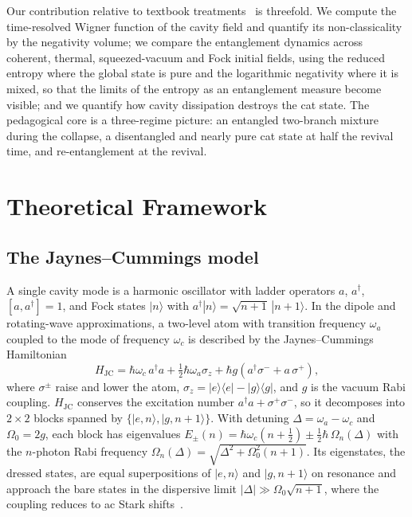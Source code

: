 \documentclass{iopjournal}
\begin{document}
Our contribution relative to textbook treatments~\cite{gerry2004, haroche2006} is threefold. We compute the time-resolved Wigner function of the cavity field and quantify its non-classicality by the negativity volume; we compare the entanglement dynamics across coherent, thermal, squeezed-vacuum and Fock initial fields, using the reduced entropy where the global state is pure and the logarithmic negativity where it is mixed, so that the limits of the entropy as an entanglement measure become visible; and we quantify how cavity dissipation destroys the cat state. The pedagogical core is a three-regime picture: an entangled two-branch mixture during the collapse, a disentangled and nearly pure cat state at half the revival time, and re-entanglement at the revival.


\section{Theoretical Framework}
\label{sec:theory}

\subsection{The Jaynes--Cummings model}
\label{sec:jcm}
A single cavity mode is a harmonic oscillator with ladder operators $a$, $a^\dagger$, $[a, a^\dagger] = 1$, and Fock states $|n\rangle$ with $a^\dagger|n\rangle = \sqrt{n+1}\,|n{+}1\rangle$. In the dipole and rotating-wave approximations, a two-level atom with transition frequency $\omega_a$ coupled to the mode of frequency $\omega_c$ is described by the Jaynes--Cummings Hamiltonian~\cite{jaynes1963, gerry2004}
\begin{equation}
H_{\text{JC}} = \hbar\omega_c\, a^\dagger a + \tfrac{1}{2}\hbar\omega_a\sigma_z + \hbar g\left(a^\dagger \sigma^- + a\,\sigma^+\right),
\label{eq:HJC}
\end{equation}
where $\sigma^\pm$ raise and lower the atom, $\sigma_z = |e\rangle\langle e| - |g\rangle\langle g|$, and $g$ is the vacuum Rabi coupling. $H_{\text{JC}}$ conserves the excitation number $a^\dagger a + \sigma^+\sigma^-$, so it decomposes into $2\times 2$ blocks spanned by $\{|e,n\rangle, |g,n{+}1\rangle\}$. With detuning $\Delta = \omega_a - \omega_c$ and $\Omega_0 = 2g$, each block has eigenvalues $E_\pm(n) = \hbar\omega_c(n + \tfrac{1}{2}) \pm \tfrac{1}{2}\hbar\,\Omega_n(\Delta)$ with the $n$-photon Rabi frequency $\Omega_n(\Delta) = \sqrt{\Delta^2 + \Omega_0^2(n+1)}$. Its eigenstates, the dressed states, are equal superpositions of $|e,n\rangle$ and $|g,n{+}1\rangle$ on resonance and approach the bare states in the dispersive limit $|\Delta| \gg \Omega_0\sqrt{n+1}$, where the coupling reduces to ac Stark shifts~\cite{haroche2006}.\label{sec:limits}
\end{document}
